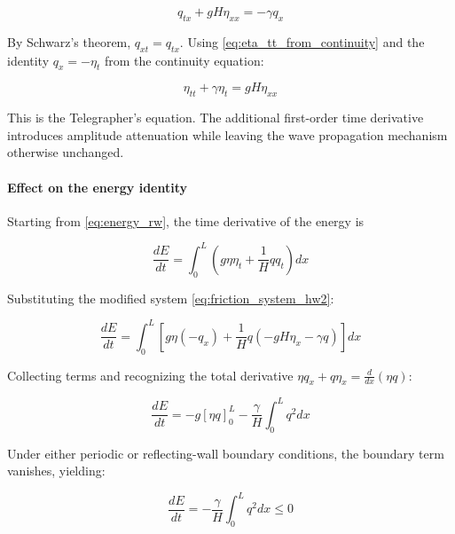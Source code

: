 \begin{equation}
q_{tx} + gH\eta_{xx} = -\gamma q_x
\label{eq:momentum_x_diff}
\end{equation}

By Schwarz's theorem, \(q_{xt}=q_{tx}\). Using \eqref{eq:eta_tt_from_continuity} and the identity \(q_x=-\eta_t\) from the continuity equation:

\begin{equation}
\eta_{tt} + \gamma\eta_t = gH\eta_{xx}
\label{eq:telegrapher_hw2}
\end{equation}

This is the Telegrapher's equation. The additional first-order time derivative introduces amplitude attenuation while leaving the wave propagation mechanism otherwise unchanged.

\paragraph{Effect on the energy identity}
Starting from \eqref{eq:energy_rw}, the time derivative of the energy is

\begin{equation}
\frac{dE}{dt}
= \int_0^L \left(g\eta\eta_t + \frac{1}{H}q q_t\right) dx
\label{eq:energy_time_derivative_friction}
\end{equation}

Substituting the modified system \eqref{eq:friction_system_hw2}:

\begin{equation}
\frac{dE}{dt}
= \int_0^L \left[g\eta(-q_x) + \frac{1}{H}q(-gH\eta_x-\gamma q)\right]dx
\label{eq:energy_substitution_friction}
\end{equation}

Collecting terms and recognizing the total derivative \(\eta q_x + q\eta_x = \frac{d}{dx}(\eta q)\):

\begin{equation}
\frac{dE}{dt}
= -g\left[\eta q\right]_0^L - \frac{\gamma}{H}\int_0^L q^2  dx
\label{eq:energy_friction_boundary_plus_bulk}
\end{equation}

Under either periodic or reflecting-wall boundary conditions, the boundary term vanishes, yielding:

\begin{equation}
\frac{dE}{dt} = -\frac{\gamma}{H}\int_0^L q^2  dx \leq 0
\label{eq:energy_dissipation_hw2}
\end{equation}

